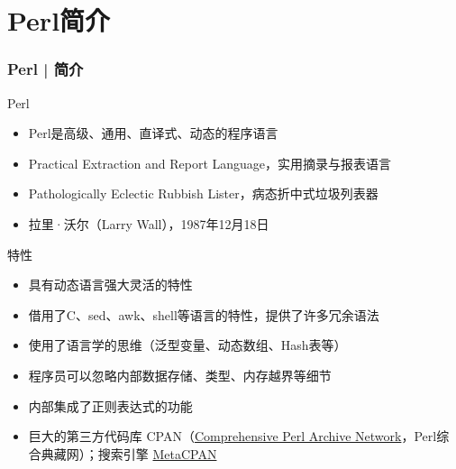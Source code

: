 \section{Perl简介}
\begin{frame}
  \frametitle{Perl | 简介}
  \begin{block}{Perl}
    \begin{itemize}
      \item Perl是高级、通用、直译式、动态的程序语言
      \item \alert{Practical Extraction and Report Language}，实用摘录与报表语言
      \item Pathologically Eclectic Rubbish Lister，病态折中式垃圾列表器
      \item 拉里·沃尔（\alert{Larry Wall}），1987年12月18日
    \end{itemize}
  \end{block}
  \pause
  \begin{block}{特性}
    \begin{itemize}
      \item 具有动态语言强大灵活的特性
      \item 借用了C、sed、awk、shell等语言的特性，提供了许多冗余语法
      \item 使用了语言学的思维（泛型变量、动态数组、Hash表等）
      \item 程序员可以忽略内部数据存储、类型、内存越界等细节
      \item 内部集成了正则表达式的功能
      \item 巨大的第三方代码库 \alert{CPAN}（\href{http://www.cpan.org/}{Comprehensive Perl Archive Network}，Perl综合典藏网）；搜索引擎 \href{https://metacpan.org/}{MetaCPAN}
    \end{itemize}
  \end{block}
\end{frame}

